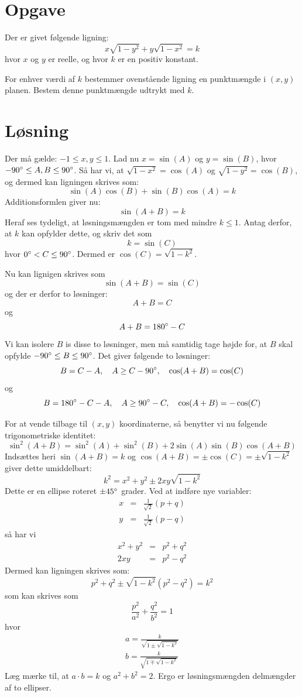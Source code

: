 \documentclass[12pt,oneside,a4paper]{article}
\newcommand{\bas}{\begin{eqnarray*}}
\newcommand{\eas}{\end{eqnarray*}}
\begin{document}
\section*{Opgave}
Der er givet følgende ligning:
$$
x\sqrt{1-y^2} + y\sqrt{1-x^2} = k
$$
hvor $x$ og $y$ er reelle, og hvor $k$ er en positiv konstant.

For enhver værdi af $k$ bestemmer ovenstående ligning en punktmængde i $(x,y)$ planen. Bestem denne punktmængde udtrykt med $k$.

\section*{Løsning}
Der må gælde: $-1\le x,y\le 1$. Lad nu $x=\sin(A)$ og
$y=\sin(B)$, hvor $-90\degree \le A,B \le 90\degree$.
Så har vi, at $\sqrt{1-x^2} = \cos(A)$ og $\sqrt{1-y^2} = \cos(B)$, og dermed kan ligningen skrives som:
$$
\sin(A) \cos(B) + \sin(B) \cos(A) = k
$$
Additionsformlen giver nu:
$$
\sin(A+B) = k
$$
Heraf ses tydeligt, at løsningsmængden er tom med mindre $k\le 1$. Antag derfor, at $k$ kan opfylder dette, og skriv det som 
$$
k = \sin(C)
$$
hvor $0\degree < C \le 90\degree$. Dermed er $\cos(C) = \sqrt{1-k^2}$.

Nu kan lignigen skrives som
$$
\sin(A+B) = \sin(C)
$$
og der er derfor to løsninger:
$$
A+B = C
$$
og 
$$
A+B = 180\degree - C
$$
Vi kan isolere $B$ is disse to løsninger, men må samtidig tage højde for, at $B$ skal opfylde $-90\degree\le B\le 90\degree$. Det giver følgende to løsninger:
$$
B = C-A, \quad A \ge C-90\degree, \quad \cos(A+B) = \cos(C)
$$
og
$$
B = 180\degree - C - A, \quad A \ge 90\degree-C, \quad \cos(A+B) = -\cos(C)
$$

For at vende tilbage til $(x,y)$ koordinaterne, så benytter vi nu følgende trigonometriske identitet:
$$
\sin^2(A+B) = \sin^2 (A) + \sin^2 (B) + 2\sin(A) \sin(B) \cos(A+B)
$$
Indsættes heri $\sin(A+B)=k$ og $\cos(A+B) = \pm\cos(C) = \pm\sqrt{1-k^2}$ giver dette umiddelbart:
$$
k^2 = x^2 + y^2 \pm 2xy \sqrt{1-k^2}
$$
Dette er en ellipse roteret $\pm 45\degree$ grader. Ved at indføre nye variabler:
\bas
x &=& \frac{1}{\sqrt 2} (p+q) \\
y &=& \frac{1}{\sqrt 2} (p-q)
\eas
så har vi
\bas
x^2 + y^2 &=& p^2 + q^2 \\
2xy &=& p^2 - q^2 
\eas
Dermed kan ligningen skrives som:
$$
p^2 + q^2 \pm \sqrt{1-k^2} (p^2-q^2) = k^2
$$
som kan skrives som
$$
\frac{p^2}{a^2} + \frac{q^2}{b^2} = 1
$$
hvor 
\bas
a = \frac{k}{\sqrt{1\pm\sqrt{1-k^2}}} \\
b = \frac{k}{\sqrt{1\mp\sqrt{1-k^2}}}
\eas
Læg mærke til, at $a\cdot b = k$ og $a^2 + b^2 = 2$.
Ergo er løsningsmængden delmængder af to ellipser.
\end{document}
